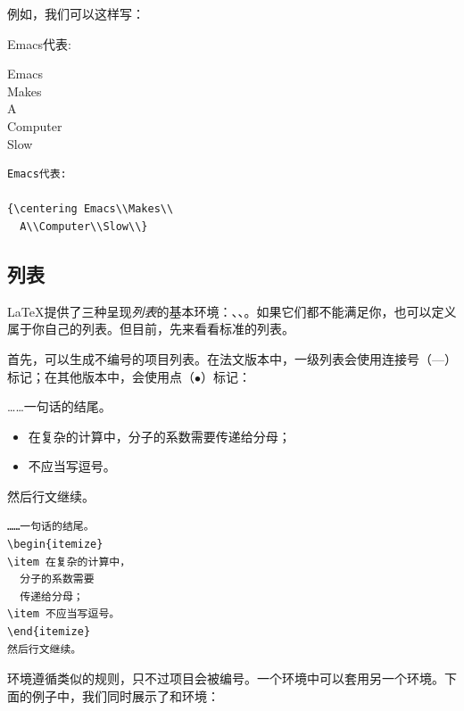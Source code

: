 例如，我们可以这样写：

\begin{codelist}[2.7]{
    Emacs代表:

    {\centering Emacs\\Makes\\
      A\\Computer\\Slow\\}
}
\begin{verbatim}
Emacs代表:

{\centering Emacs\\Makes\\
  A\\Computer\\Slow\\}\end{verbatim}
\end{codelist}

\subsection{列表}

\LaTeX 提供了三种呈现\emph{列表}的基本环境：、、。如果它们都不能满足你，也可以定义属于你自己的列表。但目前，先来看看标准的列表。

首先，可以生成不编号的项目列表。在法文版本中，一级列表会使用连接号（---）标记；在其他版本中，会使用点（$\bullet$）标记：

\begin{codelist}[2.8]{
……一句话的结尾。
\begin{itemize}
\item 在复杂的计算中，分子的系数需要传递给分母；
\item 不应当写逗号。
\end{itemize}
然后行文继续。
}
\begin{verbatim}
……一句话的结尾。
\begin{itemize}
\item 在复杂的计算中，
  分子的系数需要
  传递给分母；
\item 不应当写逗号。
\end{itemize}
然后行文继续。\end{verbatim}
\end{codelist}

环境遵循类似的规则，只不过项目会被编号。一个环境中可以套用另一个环境。下面的例子中，我们同时展示了和环境：

